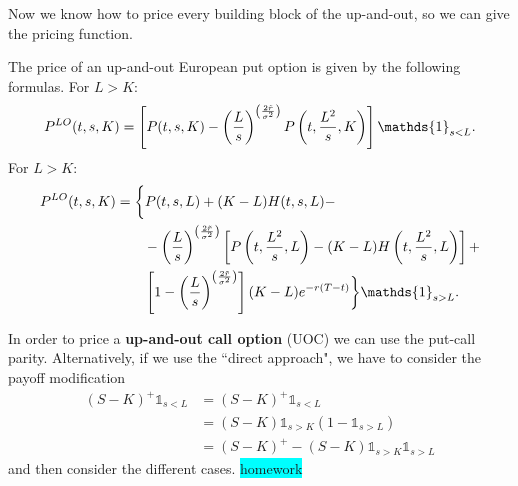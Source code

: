 Now we know how to price every building block of the up-and-out, so we can give the pricing function.
\begin{proposition}
    The price of an up-and-out European put option is given by the following formulas. For $L > K$:
    \begin{equation}
      P^{LO}(t,s,K) = \left[P(t,s,K)-\left(\frac{L}{s}\right)^{\left(\frac{2\Tilde{r}}{\sigma^2}\right)} P\left(t,\frac{L^2}{s},K\right)\right]\mathds{1}_{s<L}.
    \end{equation}
    For $L>K$:
    \begin{align}
        \notag P^{LO}(t,s,K) &= \bigg\{P(t,s,L) + (K-L)H(t,s,L) - \\
        &\qquad
        \notag - \left(\frac{L}{s}\right)^{\left(\frac{2\Tilde{r}}{\sigma^2}\right)}
        \left[P\left(t,\frac{L^2}{s},L\right) - (K-L) H\left(t,\frac{L^2}{s},L\right)\right] +\\
        &\qquad
        \left[1-\left(\frac{L}{s}\right)^{\left(\frac{2\Tilde{r}}{\sigma^2}\right)}\right] (K-L)e^{-r(T-t)}\bigg\}\mathds{1}_{s>L}.
    \end{align}
\end{proposition}
In order to price a \textbf{up-and-out call option} (UOC) we can use the put-call parity. Alternatively, if we use the ``direct approach", we have to consider the payoff modification
\begin{align*}
    (S-K)^+\mathds{1}_{s<L} &= (S-K)^+\mathds{1}_{s<L} \\
    &=
    (S-K)\mathds{1}_{s>K}(1-\mathds{1}_{s>L}) \\
    &=
    (S-K)^+ - (S-K)\mathds{1}_{s>K}\mathds{1}_{s>L}
\end{align*}
and then consider the different cases. \colorbox{cyan}{homework}


